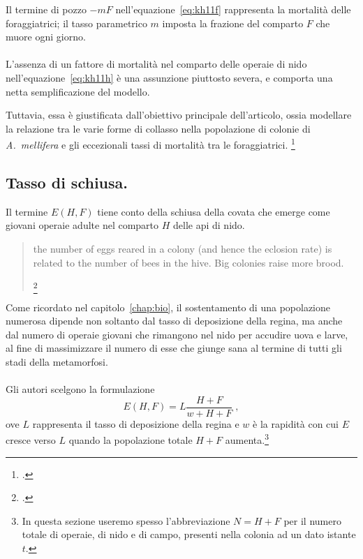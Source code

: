 Il termine di pozzo $-mF$ nell'equazione~\eqref{eq:kh11f} rappresenta la mortalità delle foraggiatrici;
il tasso parametrico $m$ imposta la frazione del comparto $F$ che muore ogni giorno.

\paragraph{}
L'assenza di un fattore di mortalità nel comparto delle operaie di nido nell'equazione~\eqref{eq:kh11h} è
una assunzione piuttosto severa, e comporta una netta semplificazione del modello.

Tuttavia, essa è giustificata dall'obiettivo principale dell'articolo, ossia modellare la relazione tra le varie
forme di collasso nella popolazione di colonie di \emph{A.~mellifera} e gli eccezionali tassi di mortalità
tra le foraggiatrici.
\footcite[1,2,3,5]{khoury2011}

\subsection{Tasso di schiusa.}
Il termine $E(H,F)$ tiene conto della schiusa della covata che emerge come giovani operaie adulte nel
comparto $H$ delle api di nido.
\blockquote[{\footcite[2]{khoury2011}}]{\omissis the number of eggs reared in a colony (and hence the eclosion rate) is related to the number of bees in the hive. Big colonies raise more brood.}

Come ricordato nel capitolo~\ref{chap:bio}, il sostentamento di una popolazione numerosa dipende non soltanto
dal tasso di deposizione della regina, ma anche dal numero di operaie giovani che rimangono nel nido per
accudire uova e larve, al fine di massimizzare il numero di esse che giunge sana al termine di tutti gli stadi
della metamorfosi.

\paragraph{}
Gli autori scelgono la formulazione
\begin{equation}
    \label{eq:eclos}
    E(H,F) = L \frac{H+F}{w + H + F} \; ,
\end{equation}
ove $L$ rappresenta il tasso di deposizione della regina e $w$ è la rapidità con cui $E$ cresce verso $L$ quando
la popolazione totale $H+F$ aumenta.\footnote{In questa sezione useremo spesso l'abbreviazione
$N=H+F$ per il numero totale di operaie, di nido e di campo, presenti nella colonia ad un dato istante $t$.}

